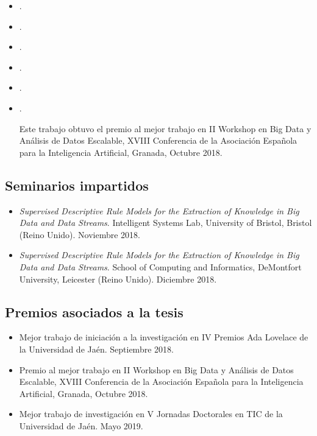 \documentclass[c5paper,10pt,twoside]{book}	   	%
\begin{document}
	\begin{itemize}
		\item {}.
		\item {}.
		\item {}.
		\item {}.
		\item {}.
		\item {}. 
		
	     Este trabajo obtuvo el premio al mejor trabajo en II Workshop en Big Data y Análisis de Datos Escalable, XVIII Conferencia de la Asociación Española para la Inteligencia Artificial, Granada, Octubre 2018.
	\end{itemize}

\subsection{Seminarios impartidos}

	\begin{itemize}
	\item \textit{Supervised Descriptive Rule Models for the Extraction of Knowledge in Big Data and Data Streams}. Intelligent Systems Lab, University of Bristol, Bristol (Reino Unido). Noviembre 2018.
	
		\item \textit{Supervised Descriptive Rule Models for the Extraction of Knowledge in Big Data and Data Streams}. School of Computing and Informatics, DeMontfort University, Leicester (Reino Unido). Diciembre 2018.
	\end{itemize}

\subsection{Premios asociados a la tesis}

\begin{itemize}
	
	\item Mejor trabajo de iniciación a la investigación en IV Premios Ada Lovelace de la Universidad de Jaén. Septiembre 2018.
		
	\item Premio al mejor trabajo en II Workshop en Big Data y Análisis de Datos Escalable, XVIII Conferencia de la Asociación Española para la Inteligencia Artificial, Granada, Octubre 2018.
	
	\item Mejor trabajo de investigación en V Jornadas Doctorales en TIC de la Universidad de Jaén. Mayo 2019.
\end{itemize}
\end{document}
